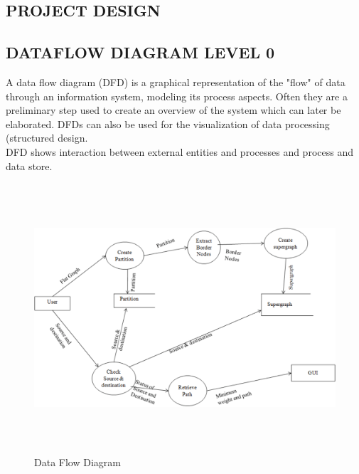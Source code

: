 

\begin{center}

\justifying
\chapter{\large PROJECT DESIGN}

\justifying
\section{\normalsize DATAFLOW DIAGRAM LEVEL 0}
\hspace{5mm} A data flow diagram (DFD) is a graphical representation of the "flow" of data through an information system, modeling its process aspects. Often they are a preliminary step used to create an overview of the system which can later be elaborated. DFDs can also be used for the visualization of data processing (structured design.\\
\hspace{5mm} DFD shows interaction between external entities and processes and process and data store.\\
\begin{figure}[H]
\includegraphics[width=16cm,height=10cm]{DFD.eps}
\caption{Data Flow Diagram}
\end{figure}
\newpage



\end{center}
